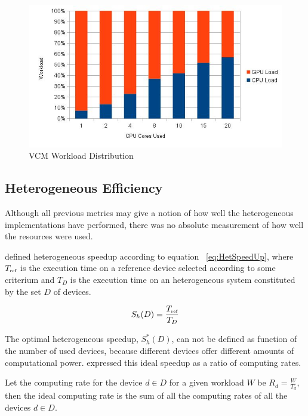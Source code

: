 \begin{figure}[H]
\centering
\includegraphics[width=0.8\linewidth]{img/vcmwl.jpg}
\caption{\label{img:vcmwl} VCM Workload Distribution}
\end{figure}

\subsection{\label{sec:hefficiency} Heterogeneous Efficiency}


Although all previous metrics may give a notion of how well the heterogeneous implementations have performed, there was no absolute measurement of how well the resources were used.

\cite{Chamberlain98} defined heterogeneous speedup according to equation ~\ref{eq:HetSpeedUp}, where $T_{\mbox{\tiny ref}}$ is the execution time on a reference device selected according to some criterium and $T_D$ is the execution time on an heterogeneous system constituted by the set $D$ of devices.

\begin{equation}
S_h(D) = \frac{T_{\mbox{\tiny ref}}}{T_D}
\label{eq:HetSpeedUp}
\end{equation}

The optimal heterogeneous speedup, $S_h^*(D)$, can not be defined as function of the number of used devices, because different devices offer different amounts of computational power. \cite{Chamberlain98} expressed this ideal speedup as a ratio of computing rates. 

Let the computing rate for the device $d \in D$ for a given workload $W$ be $R_d = \frac{W}{T_d}$, then the ideal computing rate is the sum of all the computing rates of all the devices $d \in D$.

